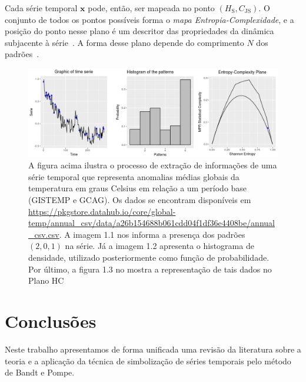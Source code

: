 \documentclass[12pt]{article}
\begin{document}
Cada série temporal $\bm x$ pode, então, ser mapeada no ponto $(H_{\text{S}}, C_{\text{JS}})$.
O conjunto de todos os pontos possíveis forma o \textit{mapa Entropia-Complexidade}, e a posição do ponto nesse plano é um descritor das propriedades da dinâmica subjacente à série~\cite{OrdinalPatternProbabilities}.
A forma desse plano depende do comprimento $N$ dos padrões~\cite{MARTIN2006439}.

\begin{figure}[hbt]
		\centering
		\includegraphics[width=1\columnwidth]{img1}        
	\caption{A figura acima ilustra o processo de extração de informações de uma série temporal que representa anomalias médias globais da temperatura em graus Celsius em relação a um período base (GISTEMP e GCAG).  Os dados se encontram disponíveis em \url{https://pkgstore.datahub.io/core/global-temp/annual_csv/data/a26b154688b061cdd04f1df36e4408be/annual_csv.csv}. A imagem 1.1 nos informa a presença dos padrões $(2,0,1)$ na série. Já a imagem 1.2 apresenta o histograma de densidade, utilizado posteriormente como função de probabilidade. Por último, a figura 1.3 no mostra a representação de tais dados no Plano HC}
	\label{fig:Img1}
\end{figure}


\section*{Conclusões}

Neste trabalho apresentamos de forma unificada uma revisão da literatura sobre a teoria e a aplicação da técnica de simbolização de séries temporais pelo método de Bandt e Pompe.
 

 

\end{document}
